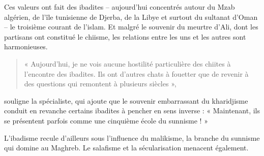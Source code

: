 Ces valeurs ont fait des ibadites – aujourd’hui concentrés autour du Mzab algérien, de l’île tunisienne de Djerba, de la Libye et surtout du sultanat d’Oman – le troisième courant de l’islam. Et malgré le souvenir du meurtre d’Ali, dont les partisans ont constitué le chiisme, les relations entre les uns et les autres sont harmonieuses. 
\begin{quote}
    « Aujourd’hui, je ne vois aucune hostilité particulière des chiites à l’encontre des ibadites. Ils ont d’autres chats à fouetter que de revenir à des questions qui remontent à plusieurs siècles »,
\end{quote} 
souligne la spécialiste, qui ajoute que le souvenir embarrassant du kharidjisme conduit en revanche certains ibadites à pencher en sens inverse : « Maintenant, ils se présentent parfois comme une cinquième école du sunnisme ! »

L’ibadisme recule d’ailleurs sous l’influence du malikisme, la branche du sunnisme qui domine au Maghreb. Le salafisme et la sécularisation menacent également. 
